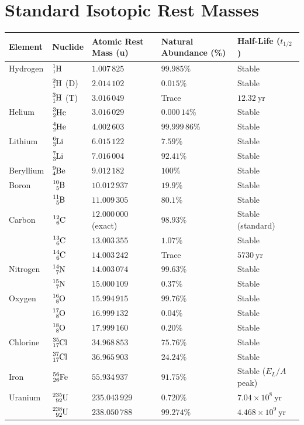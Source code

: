 \section{Standard Isotopic Rest Masses}

\renewcommand{\arraystretch}{1.25}
\begin{longtable}{@{}lllll@{}}
\toprule
\textbf{Element} & \textbf{Nuclide} & \textbf{Atomic Rest Mass (u)} & \textbf{Natural Abundance (\%)} & \textbf{Half-Life ($t_{1/2}$)} \\
\midrule
\endhead
Hydrogen & $\ce{^1_1H}$ & $1.007\,825$ & $99.985\%$ & Stable \\
& $\ce{^2_1H}$ ($\mathrm{D}$) & $2.014\,102$ & $0.015\%$ & Stable \\
& $\ce{^3_1H}$ ($\mathrm{T}$) & $3.016\,049$ & Trace & $12.32\ \mathrm{yr}$ \\
Helium & $\ce{^3_2He}$ & $3.016\,029$ & $0.000\,14\%$ & Stable \\
& $\ce{^4_2He}$ & $4.002\,603$ & $99.999\,86\%$ & Stable \\
Lithium & $\ce{^6_3Li}$ & $6.015\,122$ & $7.59\%$ & Stable \\
& $\ce{^7_3Li}$ & $7.016\,004$ & $92.41\%$ & Stable \\
Beryllium & $\ce{^9_4Be}$ & $9.012\,182$ & $100\%$ & Stable \\
Boron & $\ce{^{10}_5B}$ & $10.012\,937$ & $19.9\%$ & Stable \\
& $\ce{^{11}_5B}$ & $11.009\,305$ & $80.1\%$ & Stable \\
Carbon & $\ce{^{12}_6C}$ & $12.000\,000$ (exact) & $98.93\%$ & Stable (standard) \\
& $\ce{^{13}_6C}$ & $13.003\,355$ & $1.07\%$ & Stable \\
& $\ce{^{14}_6C}$ & $14.003\,242$ & Trace & $5730\ \mathrm{yr}$ \\
Nitrogen & $\ce{^{14}_7N}$ & $14.003\,074$ & $99.63\%$ & Stable \\
& $\ce{^{15}_7N}$ & $15.000\,109$ & $0.37\%$ & Stable \\
Oxygen & $\ce{^{16}_8O}$ & $15.994\,915$ & $99.76\%$ & Stable \\
& $\ce{^{17}_8O}$ & $16.999\,132$ & $0.04\%$ & Stable \\
& $\ce{^{18}_8O}$ & $17.999\,160$ & $0.20\%$ & Stable \\
Chlorine & $\ce{^{35}_{17}Cl}$ & $34.968\,853$ & $75.76\%$ & Stable \\
& $\ce{^{37}_{17}Cl}$ & $36.965\,903$ & $24.24\%$ & Stable \\
Iron & $\ce{^{56}_{26}Fe}$ & $55.934\,937$ & $91.75\%$ & Stable ($E_L/A$ peak) \\
Uranium & $\ce{^{235}_{92}U}$ & $235.043\,929$ & $0.720\%$ & $7.04 \times 10^8\ \mathrm{yr}$ \\
& $\ce{^{238}_{92}U}$ & $238.050\,788$ & $99.274\%$ & $4.468 \times 10^9\ \mathrm{yr}$ \\
\bottomrule
\end{longtable}

